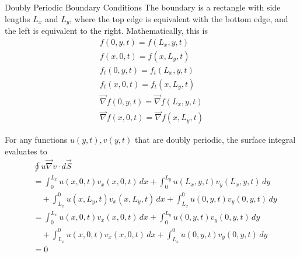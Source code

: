 \documentclass[12pt]{article}
\begin{document}
\newpage
\begin{section}{Doubly Periodic Boundary Conditions}
    The boundary is a rectangle with side lengths $L_x$ and $L_y$, where the top edge is equivalent with the bottom edge, and the left is equivalent to the right. Mathematically, this is
    \begin{align*}
        f(0,y,t) = f(L_x,y,t) \\
        f(x,0,t) = f(x,L_y,t) \\
        f_t(0,y,t) = f_t(L_x,y,t) \\
        f_t(x,0,t) = f_t(x,L_y,t) \\
        \vec\nabla f(0,y,t) = \vec\nabla f(L_x,y,t) \\
        \vec\nabla f(x,0,t) = \vec\nabla f(x,L_y,t)
    \end{align*}

    For any functions $u(y,t), v(y,t)$ that are doubly periodic, the surface integral evaluates to
    \begin{align*}
        &\oint u \vec\nabla v \cdot d\vec S \\
        &= \int_0^{L_x} u(x,0,t)v_x(x,0,t) \, dx + \int_0^{L_y} u(L_x,y,t)v_y(L_x,y,t) \, dy \\
        &\quad + \int_{L_x}^0 u(x,L_y,t)v_x(x,L_y,t) \, dx + \int_{L_x}^0 u(0,y,t)v_y(0,y,t) \, dy \\
        &= \int_0^{L_x} u(x,0,t)v_x(x,0,t) \, dx + \int_0^{L_y} u(0,y,t)v_y(0,y,t) \, dy \\
        &\quad + \int_{L_x}^0 u(x,0,t)v_x(x,0,t) \, dx + \int_{L_x}^0 u(0,y,t)v_y(0,y,t) \, dy \\
        &= 0
    \end{align*}
\end{section}
\end{document}
